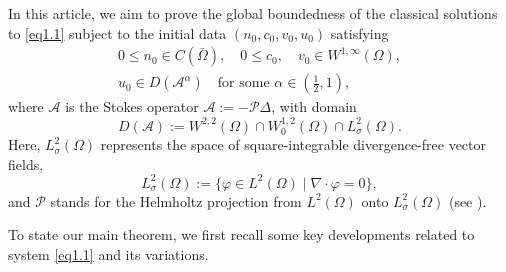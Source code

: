 \documentclass[10pt,a4paper]{amsart}
\numberwithin{equation}{section}
\begin{document}
In this article, we aim to prove the global boundedness of the classical solutions 
to \eqref{eq1.1} subject to the initial data $(n_0, c_0, v_0, u_0)$
satisfying
\begin{equation}\label{eq1.3}
\begin{gathered}
0\leq n_0 \in C(\bar{\Omega}), \quad
0\leq c_0 , \quad v_0 \in W^{1, \infty}(\Omega), \\
u_0 \in D(\mathcal{A}^\alpha) \quad \text{for some } 
\alpha \in (\frac{1}{2}, 1),
\end{gathered}
\end{equation}
where $\mathcal{A}$ is the Stokes operator \(\mathcal{A} := -\mathcal{P}\Delta\),
with domain
\[
D(\mathcal{A}) := W^{2,2}(\Omega) \cap W_0^{1,2}(\Omega) \cap L_\sigma^2(\Omega).
\]
Here, \(L_\sigma^2(\Omega)\) represents the space of square-integrable divergence-free 
vector fields, 
\[
L_\sigma^2(\Omega) := \{\varphi \in L^2(\Omega) \mid \nabla \cdot \varphi 
= 0\},
\]
and \(\mathcal{P}\) stands for the Helmholtz projection from 
\(L^2(\Omega)\) onto \(L_\sigma^2(\Omega)\) (see \cite{Sohr-2001}).

To state our main theorem, we first recall some key developments related to
system \eqref{eq1.1} and its variations.
\end{document}
